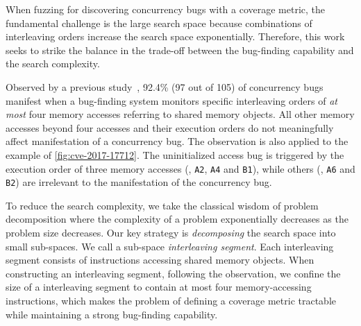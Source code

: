 
When fuzzing for discovering concurrency bugs with a coverage metric,
the fundamental challenge is the large search space because
combinations of interleaving orders increase the search space
exponentially.
%
Therefore, this work seeks to strike the balance in the trade-off
between the bug-finding capability and the search complexity.

Observed by a previous study~\cite{learningfrommistakes}, 92.4\% (97
out of 105) of concurrency bugs manifest when a bug-finding system
monitors specific interleaving orders of \textit{at most} four memory
accesses referring to shared memory objects.
%
All other memory accesses beyond four accesses and their execution
orders do not meaningfully affect manifestation of a concurrency bug.
%
The observation is also applied to the example of
\autoref{fig:cve-2017-17712}. The uninitialized access bug is
triggered by the execution order of three memory accesses (\eg,
\texttt{A2}, \texttt{A4} and \texttt{B1}), while others (\eg,
\texttt{A6} and \texttt{B2}) are irrelevant to the manifestation of
the concurrency bug.


%
%
To reduce the search complexity, we take the classical wisdom of
problem decomposition where the complexity of a problem exponentially
decreases as the problem size decreases.
%
Our key strategy is \textit{decomposing} the search space into small
sub-spaces. We call a sub-space \textit{interleaving segment}.
%
Each interleaving segment consists of instructions accessing 
shared memory objects.
%
%
When constructing an interleaving segment, following the observation, 
we confine the size of a interleaving segment 
to contain at most four memory-accessing instructions,
which makes the problem of defining a coverage metric tractable while maintaining a strong bug-finding capability.


